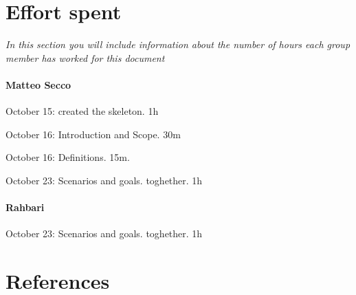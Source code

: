 \documentclass{article}
\begin{document}
\section{Effort spent} \textit{In this section you will include information about the number of hours each group member has worked for this document}
	\paragraph{Matteo Secco} 
		\begin{list}{-}{}
			\item October 15: created the skeleton. 1h
			\item October 16: Introduction and Scope. 30m
			\item October 16: Definitions. 15m.
			\item October 23: Scenarios and goals. toghether. 1h
		\end{list}
	\paragraph{Rahbari}
		\begin{list}{-}{}
			\item October 23: Scenarios and goals. toghether. 1h
		\end{list}
\section{References}
\end{document}
